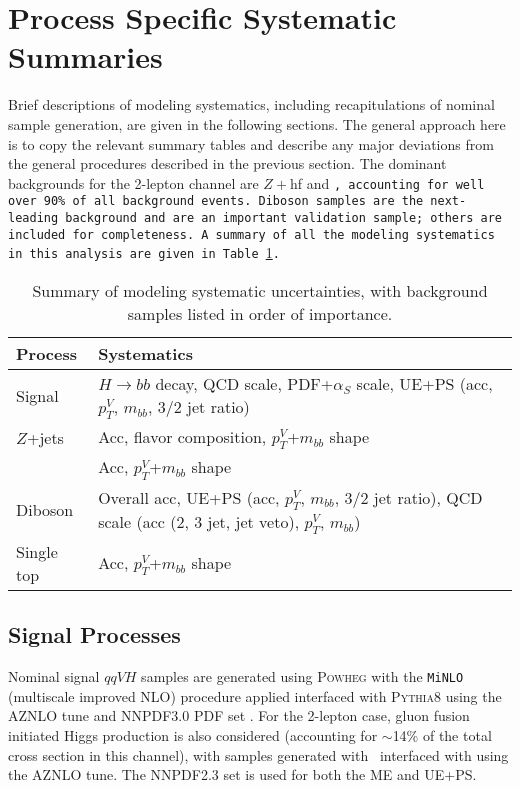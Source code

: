 \section{Process Specific Systematic Summaries}
Brief descriptions of modeling systematics, including recapitulations of nominal sample generation, are given in the following sections.  The general approach here is to copy the relevant summary tables and describe any major deviations from the general procedures described in the previous section.  The dominant backgrounds for the 2-lepton channel are $Z+$hf and \tt, accounting for well over 90\% of all background events.  Diboson samples are the next-leading background and are an important validation sample; others are included for completeness.  A summary of all the modeling systematics in this analysis are given in Table \ref{tab:modelsyssum}.  
\begin{table}[!htbp]\captionsetup{justification=centering}

  \begin{center}
    \begin{tabular}{lp{4in}}
      \hline\hline
      Process & Systematics\\
      \hline
      Signal  & $H\to bb$ decay, QCD scale, PDF+$\alpha_S$ scale, UE+PS (acc, $p_T^V$, $m_{bb}$, 3/2 jet ratio)\\
      $Z$+jets  & Acc, flavor composition, $p_T^V$+$m_{bb}$ shape\\
      \tt  & Acc, $p_T^V$+$m_{bb}$ shape\\
      Diboson  &  Overall acc, UE+PS (acc, $p_T^V$, $m_{bb}$, 3/2 jet ratio), QCD scale  (acc (2, 3 jet, jet veto), $p_T^V$, $m_{bb}$)\\
      Single top  & Acc, $p_T^V$+$m_{bb}$ shape\\
      \hline\hline
    \end{tabular}
  \end{center}
  \caption{Summary of modeling systematic uncertainties, with background samples listed in order of importance.}
  \label{tab:modelsyssum}
\end{table}

\subsection{Signal Processes}
Nominal signal $qqVH$ samples are generated using \textsc{Powheg} with the \texttt{MiNLO} (multiscale improved NLO) \cite{minlo} procedure applied interfaced with \textsc{Pythia8} using the AZNLO tune \cite{aznlo} and NNPDF3.0 PDF set \cite{nnpdf3}.  For the 2-lepton case, gluon fusion initiated Higgs production is also considered (accounting for $\sim$14\% of the total cross section in this channel), with samples generated with \powheg\ interfaced with  using the AZNLO tune.  The NNPDF2.3 set \cite{nnpdf23} is used for both the ME and UE\-+\-PS.

